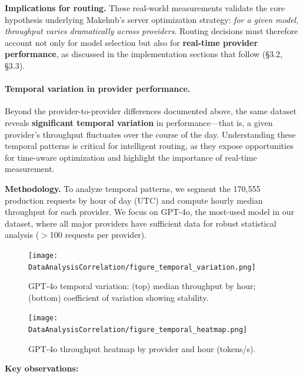 \documentclass[english]{article}
\begin{document}
\medskip

\noindent\textbf{Implications for routing.} These real-world measurements validate the core hypothesis underlying Makehub's server optimization strategy: \emph{for a given model, throughput varies dramatically across providers}. Routing decisions must therefore account not only for model selection but also for \textbf{real-time provider performance}, as discussed in the implementation sections that follow (§3.2, §3.3).

\paragraph{Temporal variation in provider performance.}

Beyond the provider-to-provider differences documented above, the same dataset reveals \textbf{significant temporal variation} in performance—that is, a given provider's throughput fluctuates over the course of the day. Understanding these temporal patterns is critical for intelligent routing, as they expose opportunities for time-aware optimization and highlight the importance of real-time measurement.

\medskip

\noindent\textbf{Methodology.} To analyze temporal patterns, we segment the 170,555 production requests by hour of day (UTC) and compute hourly median throughput for each provider. We focus on GPT-4o, the most-used model in our dataset, where all major providers have sufficient data for robust statistical analysis ($>$100 requests per provider).

\begin{figure}[H]
\centering
\texttt{[image: DataAnalysisCorrelation/figure\_temporal\_variation.png]}
\caption{GPT-4o temporal variation: (top) median throughput by hour; (bottom) coefficient of variation showing stability.}
\label{fig:temporal_variation}
\end{figure}

\begin{figure}[H]
\centering
\texttt{[image: DataAnalysisCorrelation/figure\_temporal\_heatmap.png]}
\caption{GPT-4o throughput heatmap by provider and hour (tokens/s).}
\label{fig:temporal_heatmap}
\end{figure}

\medskip

\noindent\textbf{Key observations:}
\end{document}
